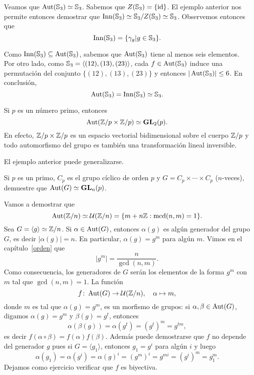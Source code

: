 \begin{example}
Veamos que $\operatorname{Aut}(\mathbb{S}_3)\simeq\mathbb{S}_3$. Sabemos que $Z(\mathbb{S}_3)=\{\operatorname{id}\}$. El ejemplo anterior nos permite entonces demostrar que
$\mathrm{Inn}(\mathbb{S}_3)\simeq\mathbb{S}_3/Z(\mathbb{S}_3)\simeq\mathbb{S}_3$. Observemos entonces que 
\[
\mathrm{Inn}(\mathbb{S}_3)=\{\gamma_g|g\in\mathbb{S}_3\}.
\]

Como $\mathrm{Inn}(\mathbb{S}_3)\subseteq\operatorname{Aut}(\mathbb{S}_3)$, sabemos que $\operatorname{Aut}(\mathbb{S}_3)$ tiene al menos seis elementos.
Por otro lado, como $\mathbb{S}_3=\langle (12),(13),(23)\rangle$, cada $f\in\operatorname{Aut}(\mathbb{S}_3)$ induce una permutación del conjunto $\{(12),(13),(23)\}$ y entonces $|\operatorname{Aut}(\mathbb{S}_3)|\leq6$. En conclusión,
\[
\operatorname{Aut}(\mathbb{S}_3)=\mathrm{Inn}(\mathbb{S}_3)\simeq\mathbb{S}_3.
\]   
\end{example}

\begin{example}
Si $p$ es un número primo, entonces
\[
\operatorname{Aut}(\mathbb{Z}/p\times\mathbb{Z}/p)\simeq\mathbf{GL}_2(p).
\] 
En efecto, $\mathbb{Z}/p\times\mathbb{Z}/p$ es un espacio vectorial bidimensional sobre el cuerpo $\mathbb{Z}/p$ y
todo automorfismo del grupo es también una transformación lineal inversible.    
\end{example}

El ejemplo anterior puede generalizarse. 

\begin{exercise}
Si $p$ es un primo, $C_p$ es el grupo cíclico de orden $p$ y $G=C_p\times\cdots\times C_p$ ($n$-veces), demuestre que
$\operatorname{Aut}(G)\simeq\mathbf{GL}_n(p)$.
\end{exercise}

\begin{example}
Vamos a demostrar que 
\[
\operatorname{Aut}(\mathbb{Z}/n)\simeq\mathcal{U}(\mathbb{Z}/n)=\{m+n\mathbb{Z}:\operatorname{mcd}(n,m)=1\}.
\]
Sea $G=\langle g\rangle\simeq\mathbb{Z}/n$. Si $\alpha\in\operatorname{Aut}(G)$, entonces $\alpha(g)$ es algún generador del grupo $G$, es decir $|\alpha(g)|=n$. En particular, $\alpha(g)=g^m$ para algún $m$. Vimos en el capítulo~\ref{orden} que 
\[
|g^m|=\frac{n}{\gcd(n,m)}.
\]
Como consecuencia, los generadores de $G$ serán los elementos de la forma $g^m$ con $m$ tal que $\gcd(n,m)=1$. La función
\[
f\colon \operatorname{Aut}(G)\to\mathcal{U}(\mathbb{Z}/n),\quad
\alpha\mapsto m,
\]
donde $m$ es tal que $\alpha(g)=g^m$, es un morfismo de grupos: si $\alpha,\beta\in\operatorname{Aut}(G)$, digamos $\alpha(g)=g^m$ y $\beta(g)=g^t$, entonces 
\[
\alpha(\beta(g))=\alpha(g^t)=(g^t)^m=g^{tm},
\]
es decir $f(\alpha\circ\beta)=f(\alpha)f(\beta)$. Además puede demostrarse que $f$ no depende del generador $g$ pues si $G=\langle g_1\rangle$, entonces $g_1=g^i$ para algún $i$ y luego 
\[
\alpha(g_1)=\alpha(g^i)=\alpha(g)^i=(g^m)^i=g^{mi}=(g^i)^m=g_1^m.
\] 
Dejamos como ejercicio verificar que $f$ es biyectiva. 
\end{example}

